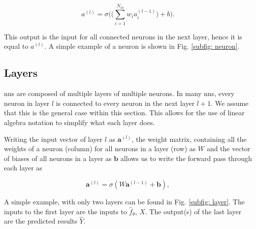         \begin{equation}
            \label{eq: feed forward}
            a^{(l)} = \sigma\bigg(\big(\sum_{i = 1}^{N_{in}} w_i a_i^{(l-1)}\big) + b\bigg).
        \end{equation}
        
        This output is the input for all connected \glspl{neuron} in the next layer, hence it is equal to $a^{(l)}$. 
        A simple example of a \gls{neuron} is shown in Fig. \ref{subfig: neuron}.
    
    \subsection{Layers}
        \glspl{nn} are composed of multiple layers of multiple \glspl{neuron}. In many \glspl{nn}, every \gls{neuron} in layer $l$ is connected to every \gls{neuron} in the next layer $l + 1$. We assume that this is the general case within this section. This allows for the use of linear algebra notation to simplify what each layer does.
        
        Writing the input vector of layer $l$ as $\mathbf{a}^{(l)}$, the weight matrix, containing all the weights of a \gls{neuron} (column) for all \glspl{neuron} in a layer (row) as $W$ and the vector of biases of all \glspl{neuron} in a layer as $\mathbf{b}$ allows us to write the forward pass through each layer as
        
        \begin{equation}
            \mathbf{a}^{(l)} = \sigma(W\mathbf{a}^{(l-1)} + \mathbf{b}),
        \end{equation}
        
        A simple example, with only two layers can be found in Fig. \ref{subfig: layer}. The inputs to the first layer are the inputs to $\hat{f}_\theta$, $X$. The output(s) of the last layer are the predicted results $\hat{Y}$. 
        
